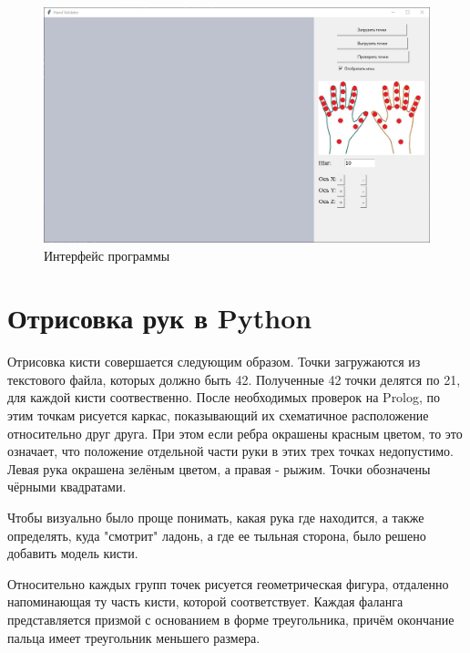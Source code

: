 \begin{figure}[ht!]
	\centering
	\includegraphics[scale=0.5]{example_gui.jpg}
	\caption{Интерфейс программы}
	\label{fig:gui}
\end{figure}

\section{Отрисовка рук в Python}

\hspace{0.6cm} Отрисовка кисти совершается следующим образом. Точки загружаются из текстового файла, которых должно быть 42. Полученные 42 точки делятся по 21, для каждой кисти соотвественно. После необходимых проверок на Prolog, по этим точкам рисуется каркас, показывающий их схематичное расположение относительно друг друга. При этом если ребра окрашены красным цветом, то это означает, что положение отдельной части руки в этих трех точках недопустимо. Левая рука окрашена зелёным цветом, а правая - рыжим. Точки обозначены чёрными квадратами.

\hspace{0.6cm} Чтобы визуально было проще понимать, какая рука где находится, а также определять, куда "смотрит" ладонь, а где ее тыльная сторона, было решено добавить модель кисти.

\hspace{0.6cm} Относительно каждых групп точек рисуется геометрическая фигура, отдаленно напоминающая ту часть кисти, которой соответствует. Каждая фаланга представляется призмой с основанием в форме треугольника, причём окончание пальца имеет треугольник меньшего размера.

